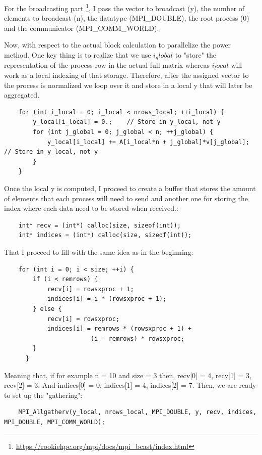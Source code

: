 \documentclass[unicode,11pt,a4paper,oneside,numbers=endperiod,openany]{scrartcl}
\begin{document}
For the broadcasting part \footnote{\url{https://rookiehpc.org/mpi/docs/mpi_bcast/index.html}}, I pass the vector to broadcast (y), the number of elements to broadcast (n), the datatype (MPI\_DOUBLE), 
the root process (0) and the communicator (MPI\_COMM\_WORLD).

Now, with respect to the actual block calculation to parallelize the power method. One key thing is to realize that we use $i_global$ to "store" the representation
of the process row in the actual full matrix whereas $i_local$ will work as a local indexing of that storage. Therefore, after the assigned vector to the process is normalized
we loop over it and store in a local y that will later be aggregated. 

\begin{lstlisting}
    for (int i_local = 0; i_local < nrows_local; ++i_local) {
        y_local[i_local] = 0.;    // Store in y_local, not y
        for (int j_global = 0; j_global < n; ++j_global) {
            y_local[i_local] += A[i_local*n + j_global]*v[j_global];  // Store in y_local, not y
        }
    } 
\end{lstlisting}

Once the local y is computed, I proceed to create a buffer that stores the amount of elements that each process will need to send 
and another one for storing the index where each data need to be stored when received.:

\begin{lstlisting}
    int* recv = (int*) calloc(size, sizeof(int)); 
    int* indices = (int*) calloc(size, sizeof(int)); 
\end{lstlisting}

That I proceed to fill with the same idea as in the beginning:

\begin{lstlisting}
    for (int i = 0; i < size; ++i) { 
        if (i < remrows) {
            recv[i] = rowsxproc + 1;
            indices[i] = i * (rowsxproc + 1);
        } else {
            recv[i] = rowsxproc;
            indices[i] = remrows * (rowsxproc + 1) + 
                        (i - remrows) * rowsxproc;
        }
      }
\end{lstlisting}

Meaning that, if for example n = 10 and size = 3 then, recv[0] = 4, recv[1] = 3, recv[2] = 3. And indices[0] = 0, indices[1] = 4, indices[2] = 7.
Then, we are ready to set up the "gathering": 

\begin{lstlisting}
    MPI_Allgatherv(y_local, nrows_local, MPI_DOUBLE, y, recv, indices, MPI_DOUBLE, MPI_COMM_WORLD);
\end{lstlisting}
\end{document}
